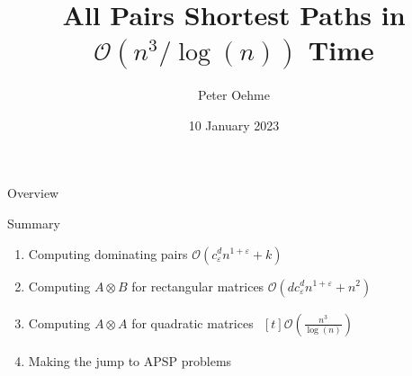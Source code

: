 

\author{Peter Oehme}
\title{All Pairs Shortest Paths in \texorpdfstring{$\mathcal{O}(n^3 / \log(n))$}{O (n \^{} 3 / log (n))} Time}
\date{10 January 2023}




\begin{frame}
    \maketitle
\end{frame}

\begin{frame}{Overview}
    \tableofcontents
\end{frame}






\begin{frame}{Summary}
    \begin{enumerate}
        \item Computing dominating pairs $\mathcal{O}\left( c_\varepsilon^d n^{1 + \varepsilon} + k \right)$
        \item<2-> Computing $A \otimes B$ for rectangular matrices $\mathcal{O}\left( d c_\varepsilon^d n^{1 + \varepsilon} + n^2 \right)$
        \item<3-> Computing $A \otimes A$ for quadratic matrices $\begin{aligned}[t]\mathcal{O}\left( \frac{n^3}{\log(n)} \right)\end{aligned}$
        \item<4-> Making the jump to APSP problems
    \end{enumerate}

\end{frame}



